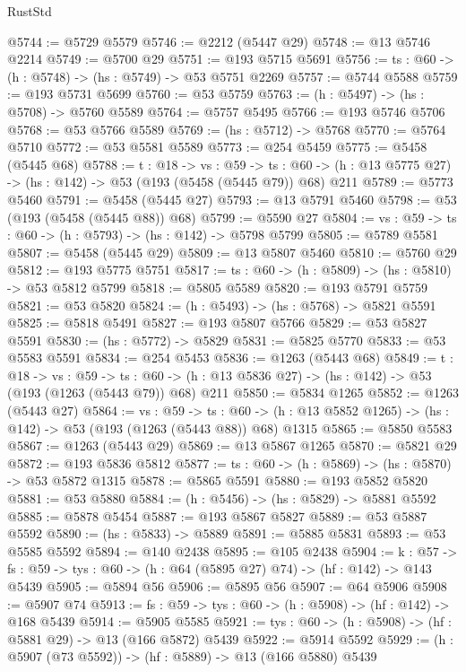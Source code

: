 \begin{lexlean}{RustStd}
\begin{coremodule}
@5744 := @5729 @5579
@5746 := @2212 (@5447 @29)
@5748 := @13 @5746 @2214
@5749 := @5700 @29
@5751 := @193 @5715 @5691
@5756 := {ts : @60} -> (h : @5748) -> (hs : @5749) -> @53 @5751 @2269
@5757 := @5744 @5588
@5759 := @193 @5731 @5699
@5760 := @53 @5759
@5763 := (h : @5497) -> (hs : @5708) -> @5760 @5589
@5764 := @5757 @5495
@5766 := @193 @5746 @5706
@5768 := @53 @5766 @5589
@5769 := (hs : @5712) -> @5768
@5770 := @5764 @5710
@5772 := @53 @5581 @5589
@5773 := @254 @5459
@5775 := @5458 (@5445 @68)
@5788 := {t : @18} ->
  {vs : @59} ->
  {ts : @60} -> (h : @13 @5775 @27) -> (hs : @142) -> @53 (@193 (@5458 (@5445 @79)) @68) @211
@5789 := @5773 @5460
@5791 := @5458 (@5445 @27)
@5793 := @13 @5791 @5460
@5798 := @53 (@193 (@5458 (@5445 @88)) @68)
@5799 := @5590 @27
@5804 := {vs : @59} -> {ts : @60} -> (h : @5793) -> (hs : @142) -> @5798 @5799
@5805 := @5789 @5581
@5807 := @5458 (@5445 @29)
@5809 := @13 @5807 @5460
@5810 := @5760 @29
@5812 := @193 @5775 @5751
@5817 := {ts : @60} -> (h : @5809) -> (hs : @5810) -> @53 @5812 @5799
@5818 := @5805 @5589
@5820 := @193 @5791 @5759
@5821 := @53 @5820
@5824 := (h : @5493) -> (hs : @5768) -> @5821 @5591
@5825 := @5818 @5491
@5827 := @193 @5807 @5766
@5829 := @53 @5827 @5591
@5830 := (hs : @5772) -> @5829
@5831 := @5825 @5770
@5833 := @53 @5583 @5591
@5834 := @254 @5453
@5836 := @1263 (@5443 @68)
@5849 := {t : @18} ->
  {vs : @59} ->
  {ts : @60} -> (h : @13 @5836 @27) -> (hs : @142) -> @53 (@193 (@1263 (@5443 @79)) @68) @211
@5850 := @5834 @1265
@5852 := @1263 (@5443 @27)
@5864 := {vs : @59} ->
  {ts : @60} -> (h : @13 @5852 @1265) -> (hs : @142) -> @53 (@193 (@1263 (@5443 @88)) @68) @1315
@5865 := @5850 @5583
@5867 := @1263 (@5443 @29)
@5869 := @13 @5867 @1265
@5870 := @5821 @29
@5872 := @193 @5836 @5812
@5877 := {ts : @60} -> (h : @5869) -> (hs : @5870) -> @53 @5872 @1315
@5878 := @5865 @5591
@5880 := @193 @5852 @5820
@5881 := @53 @5880
@5884 := (h : @5456) -> (hs : @5829) -> @5881 @5592
@5885 := @5878 @5454
@5887 := @193 @5867 @5827
@5889 := @53 @5887 @5592
@5890 := (hs : @5833) -> @5889
@5891 := @5885 @5831
@5893 := @53 @5585 @5592
@5894 := @140 @2438
@5895 := @105 @2438
@5904 := {k : @57} ->
  {fs : @59} -> {tys : @60} -> (h : @64 (@5895 @27) @74) -> (hf : @142) -> @143 @5439
@5905 := @5894 @56
@5906 := @5895 @56
@5907 := @64 @5906
@5908 := @5907 @74
@5913 := {fs : @59} -> {tys : @60} -> (h : @5908) -> (hf : @142) -> @168 @5439
@5914 := @5905 @5585
@5921 := {tys : @60} -> (h : @5908) -> (hf : @5881 @29) -> @13 (@166 @5872) @5439
@5922 := @5914 @5592
@5929 := (h : @5907 (@73 @5592)) -> (hf : @5889) -> @13 (@166 @5880) @5439

\end{coremodule}
\end{lexlean}
